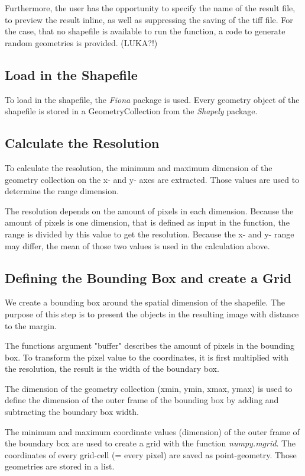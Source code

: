 \documentclass[10pt, a4paper]{article}
\begin{document}
Furthermore, the user has the opportunity to specify the name of the result file, to preview the result inline, as well as suppressing the saving of the tiff file.
For the case, that no shapefile is available to run the function, a code to generate random geometries is provided. (LUKA?!)


\subsection{Load in the Shapefile}
To load in the shapefile, the \textit{Fiona} package is used. Every geometry object of the shapefile is stored in a GeometryCollection from the \emph{Shapely} package.

\subsection{Calculate the Resolution}
To calculate the resolution, the minimum and maximum dimension of the geometry collection on the x- and y- axes are extracted.  Those values are used to determine the range dimension. 

The resolution depends on the amount of pixels in each dimension. Because the amount of pixels is one dimension, that is defined as input in the function, the range is divided by this value to get the resolution. Because the x- and y- range may differ, the mean of those two values is used in the calculation above. 

\subsection{Defining the Bounding Box and create a Grid}
We create a bounding box around the spatial dimension of the shapefile. The purpose of this step is to present the objects in the resulting image with distance to the margin.

The functions argument "buffer" describes the amount of pixels in the bounding box.  To transform the pixel value to the coordinates, it is first multiplied with the resolution, the result is the width of the boundary box.

The dimension of the geometry collection (xmin, ymin, xmax, ymax) is used to define the dimension of the outer frame of the bounding box by adding and subtracting the boundary box width.

The minimum and maximum coordinate values (dimension) of the outer frame of the boundary box are used to create a grid with the function \textit{numpy.mgrid}. The coordinates of every grid-cell (= every pixel) are saved as point-geometry. Those geometries are stored in a list.
\end{document}
